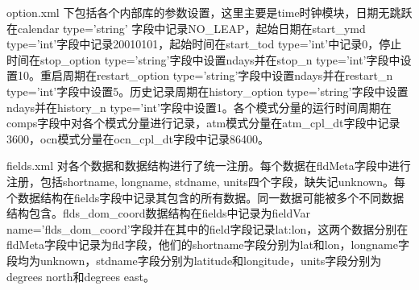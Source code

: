 option.xml 下包括各个内部库的参数设置，这里主要是time时钟模块，日期无跳跃在calendar type='string' 字段中记录NO\_LEAP，起始日期在start\_ymd type='int'字段中记录20010101，起始时间在start\_tod type='int'中记录0，停止时间在stop\_option type='string'字段中设置ndays并在stop\_n type='int'字段中设置10。重启周期在restart\_option type='string'字段中设置ndays并在restart\_n type='int'字段中设置5。历史记录周期在history\_option type='string'字段中设置ndays并在history\_n type='int'字段中设置1。各个模式分量的运行时间周期在comps字段中对各个模式分量进行记录，atm模式分量在atm\_cpl\_dt字段中记录3600，ocn模式分量在ocn\_cpl\_dt字段中记录86400。

fields.xml 对各个数据和数据结构进行了统一注册。每个数据在fldMeta字段中进行注册，包括shortname, longname, stdname, units四个字段，缺失记unknown。每个数据结构在fields字段中记录其包含的所有数据。同一数据可能被多个不同数据结构包含。flds\_dom\_coord数据结构在fields中记录为fieldVar name='flds\_dom\_coord'字段并在其中的field字段记录lat:lon，这两个数据分别在fldMeta字段中记录为fld字段，他们的shortname字段分别为lat和lon，longname字段均为unknown，stdname字段分别为latitude和longitude，units字段分别为degrees north和degrees east。

